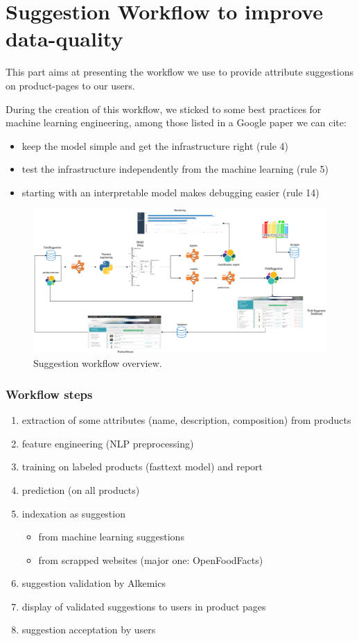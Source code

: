 \pagebreak
\section{Suggestion Workflow to improve data-quality}


This part aims at presenting the workflow we use to provide attribute suggestions on product-pages to our users.

During the creation of this workflow, we sticked to some best practices for machine learning engineering, among those listed in a Google paper \cite{RulesMLGoogle} we can cite:
\begin{itemize}
	\item keep the model simple and get the infrastructure right (rule 4)
	\item test the infrastructure independently from the machine learning (rule 5)
	\item starting with an interpretable model makes debugging easier (rule 14)
\end{itemize}

\begin{figure}[H]
\centering
\includegraphics[scale=0.30]{./images/workflow/fieldsuggestion-workflow.png}
\caption{Suggestion workflow overview.}
\end{figure}

\subsubsection{Workflow steps}
\begin{enumerate}
	\item extraction of some attributes (name, description, composition) from products
	\item feature engineering (NLP preprocessing)
	\item training on labeled products (fasttext model) and report
	\item prediction (on all products)
	\item indexation as suggestion
	\begin{itemize}
		\item from machine learning suggestions
		\item from scrapped websites (major one: OpenFoodFacts)
	\end{itemize}
	\item suggestion validation by Alkemics
	\item display of validated suggestions to users in product pages
	\item suggestion acceptation by users
\end{enumerate}


